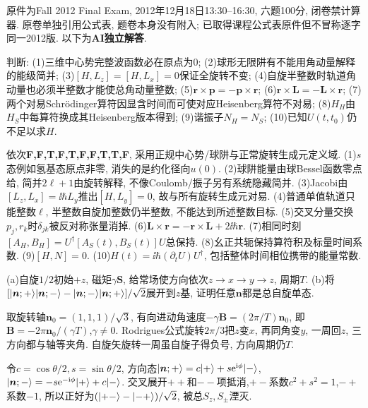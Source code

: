 原件为Fall 2012 Final Exam, 2012年12月18日13:30--16:30, 六题100分, 闭卷禁计算器. 原卷单独引用公式表, 题卷本身没有附入; 已取得课程公式表原件但不冒称逐字同一2012版. 以下为\textbf{AI独立解答}.
\begin{exercise}
判断: (1)三维中心势完整波函数必在原点为0; (2)球形无限阱有不能用角动量解释的能级简并; (3)$[H,L_z]=[H,L_x]=0$保证全旋转不变; (4)自旋半整数时轨道角动量也必须半整数才能使总角动量整数; (5)$\boldsymbol r\times\boldsymbol p=-\boldsymbol p\times\boldsymbol r$; (6)$\boldsymbol r\times\boldsymbol L=-\boldsymbol L\times\boldsymbol r$; (7)两个对易Schrödinger算符因显含时间而可使对应Heisenberg算符不对易; (8)$H_H$由$H_S$中每算符换成其Heisenberg版本得到; (9)谐振子$N_H=N_S$; (10)已知$U(t,t_0)$仍不足以求$H$.
\end{exercise}
\begin{solution}
依次\textbf{F,F,T,F,T,F,F,T,T,F}, 采用正规中心势/球阱与正常旋转生成元定义域. (1)$s$态例如氢基态原点非零, 消失的是约化径向$u(0)$. (2)球阱能量由球Bessel函数零点给, 简并$2\ell+1$由旋转解释, 不像Coulomb/振子另有系统隐藏简并. (3)Jacobi由$[L_z,L_x]=\ii\hbar L_y$推出$[H,L_y]=0$, 故与所有旋转生成元对易. (4)普通单值轨道只能整数$\ell$, 半整数自旋加整数仍半整数, 不能达到所述整数目标. (5)交叉分量交换$p_j,r_k$时$\delta_{jk}$被反对称张量消掉. (6)$\boldsymbol L\times\boldsymbol r=-\boldsymbol r\times\boldsymbol L+2\ii\hbar\boldsymbol r$. (7)相同时刻$[A_H,B_H]=U^\dagger[A_S(t),B_S(t)]U$总保持. (8)幺正共轭保持算符积及标量时间系数. (9)$[H,N]=0$. (10)$H(t)=\ii\hbar(\partial_tU)U^\dagger$, 包括整体时间相位携带的能量常数.
\end{solution}
\begin{exercise}
(a)自旋$1/2$初始$+z$, 磁矩$\gamma\boldsymbol S$, 给常场使方向依次$z\to x\to y\to z$, 周期$T$. (b)将$[\lvert \boldsymbol n;+\rangle\lvert \boldsymbol n;-\rangle-\lvert \boldsymbol n;-\rangle\lvert \boldsymbol n;+\rangle]/\sqrt2$展开到$z$基, 证明任意$\boldsymbol n$都是总自旋单态.
\end{exercise}
\begin{solution}
取旋转轴$\boldsymbol n_0=(1,1,1)/\sqrt3$, 有向进动角速度$-\gamma\boldsymbol B=(2\pi/T)\boldsymbol n_0$, 即$\boldsymbol B=-2\pi\boldsymbol n_0/(\gamma T)$,$\gamma\neq0$. Rodrigues公式旋转$2\pi/3$把$z$变$x$, 再同角变$y$, 一周回$z$, 三方向都与轴等夹角. 自旋矢旋转一周虽自旋子得负号, 方向周期仍$T$.

令$c=\cos\theta/2,s=\sin\theta/2$, 方向态$\lvert \boldsymbol n;+\rangle=c\lvert +\rangle+s\mathrm e^{\mathrm i\phi}\lvert -\rangle$,$\lvert \boldsymbol n;-\rangle=-s\mathrm e^{-\mathrm i\phi}\lvert +\rangle+c\lvert -\rangle$. 交叉展开$++$和$--$项抵消,$+-$系数$c^2+s^2=1$,$-+$系数$-1$, 所以正好为$(\lvert +-\rangle-\lvert -+\rangle)/\sqrt2$, 被总$S_z,S_\pm$湮灭.
\end{solution}
